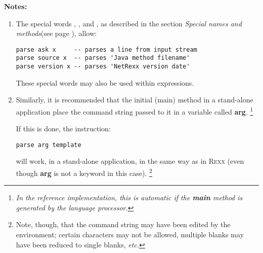 \textbf{Notes:}
\begin{enumerate}
\item 
The special words , , and ,
as described in the section  \emph{Special names and methods}(see page \pageref{refspecial}), allow:
\begin{lstlisting}
parse ask x     -- parses a line from input stream
parse source x  -- parses 'Java method filename'
parse version x -- parses 'NetRexx version date'
\end{lstlisting}
These special words may also be used within expressions.
\item 
Similarly, it is recommended that the initial (main) method in a
stand-alone application place the command string passed to it in a
variable called \textbf{arg}.
\footnote{
\emph{In the reference implementation, this is automatic if
the \textbf{main} method is generated by the \nr{} language
processor.}
}
 
If this is done, the instruction:
\begin{lstlisting}
parse arg template
\end{lstlisting}
will work, in a stand-alone application, in the same way as in R\textsc{exx}
(even though \textbf{arg} is not a keyword in this case).
\footnote{
Note, though, that the command string may have been edited by the
environment; certain characters may not be allowed, multiple blanks may
have been reduced to single blanks, \emph{etc.}
}
\end{enumerate}
